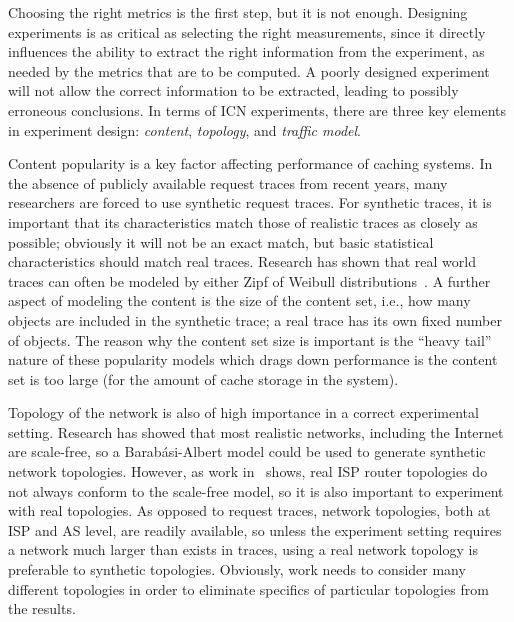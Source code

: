 \documentclass{sigcomm-alternate}
\begin{document}
Choosing the right metrics is the first step, but it is not enough.
Designing experiments is as critical as selecting the right measurements, since it directly influences the ability to extract the right information from the experiment, as needed by the metrics that are to be computed.
A poorly designed experiment will not allow the correct information to be extracted, leading to possibly erroneous conclusions.
In terms of ICN experiments, there are three key elements in experiment design: \emph{content}, \emph{topology}, and \emph{traffic model}.



Content popularity is a key factor affecting performance of caching systems.
In the absence of publicly available request traces from recent years, many researchers are forced to use synthetic request traces.
For synthetic traces, it is important that its characteristics match those of realistic traces as closely as possible; obviously it will not be an exact match, but basic statistical characteristics should match real traces.
Research has shown that real world traces can often be modeled by either Zipf of Weibull distributions~\cite{Cha:2007:ITY:1298306.1298309}.
A further aspect of modeling the content is the size of the content set, i.e., how many objects are included in the synthetic trace; a real trace has its own fixed number of objects.
The reason why the content set size is important is the ``heavy tail'' nature of these popularity models which drags down performance is the content set is too large (for the amount of cache storage in the system).






Topology of the network is also of high importance in a correct experimental setting.
Research has showed that most realistic networks, including the Internet are scale-free, so a Barab\'{a}si-Albert model could be used to generate synthetic network topologies.
However, as work in~\cite{SpringN:Rocketfuel} shows, real ISP router topologies do not always conform to the scale-free model, so it is also important to experiment with real topologies.
As opposed to request traces, network topologies, both at ISP and AS level, are readily available, so unless the experiment setting requires a network much larger than exists in traces, using a real network topology is preferable to synthetic topologies.
Obviously, work needs to consider many different topologies in order to eliminate specifics of particular topologies from the results.
\end{document}
